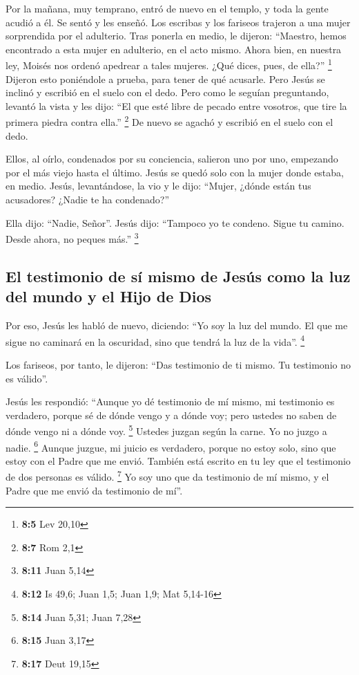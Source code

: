 \begin{paracol}{2}
 Por la mañana, muy temprano, entró de nuevo en el templo,
y toda la gente acudió a él. Se sentó y les enseñó.  Los
escribas y los fariseos trajeron a una mujer sorprendida por el
adulterio. Tras ponerla en medio,  le dijeron: ``Maestro,
hemos encontrado a esta mujer en adulterio, en el acto mismo.
 Ahora bien, en nuestra ley, Moisés nos ordenó apedrear a
tales mujeres. ¿Qué dices, pues, de ella?'' \footnote{\textbf{8:5} Lev
  20,10}  Dijeron esto poniéndole a prueba, para tener de
qué acusarle. Pero Jesús se inclinó y escribió en el suelo con el dedo.
 Pero como le seguían preguntando, levantó la vista y les
dijo: ``El que esté libre de pecado entre vosotros, que tire la primera
piedra contra ella.'' \footnote{\textbf{8:7} Rom 2,1}  De
nuevo se agachó y escribió en el suelo con el dedo.

 Ellos, al oírlo, condenados por su conciencia, salieron
uno por uno, empezando por el más viejo hasta el último. Jesús se quedó
solo con la mujer donde estaba, en medio.  Jesús,
levantándose, la vio y le dijo: ``Mujer, ¿dónde están tus acusadores?
¿Nadie te ha condenado?''

 Ella dijo: ``Nadie, Señor''. Jesús dijo: ``Tampoco yo te
condeno. Sigue tu camino. Desde ahora, no peques más.'' \footnote{\textbf{8:11}
  Juan 5,14}

\hypertarget{el-testimonio-de-suxed-mismo-de-jesuxfas-como-la-luz-del-mundo-y-el-hijo-de-dios}{%
\subsection{El testimonio de sí mismo de Jesús como la luz del mundo y
el Hijo de
Dios}\label{el-testimonio-de-suxed-mismo-de-jesuxfas-como-la-luz-del-mundo-y-el-hijo-de-dios}}

 Por eso, Jesús les habló de nuevo, diciendo: ``Yo soy la
luz del mundo. El que me sigue no caminará en la oscuridad, sino que
tendrá la luz de la vida''. \footnote{\textbf{8:12} Is 49,6; Juan 1,5;
  Juan 1,9; Mat 5,14-16}

 Los fariseos, por tanto, le dijeron: ``Das testimonio de
ti mismo. Tu testimonio no es válido''.

 Jesús les respondió: ``Aunque yo dé testimonio de mí
mismo, mi testimonio es verdadero, porque sé de dónde vengo y a dónde
voy; pero ustedes no saben de dónde vengo ni a dónde voy. \footnote{\textbf{8:14}
  Juan 5,31; Juan 7,28}  Ustedes juzgan según la carne.
Yo no juzgo a nadie. \footnote{\textbf{8:15} Juan 3,17} 
Aunque juzgue, mi juicio es verdadero, porque no estoy solo, sino que
estoy con el Padre que me envió.  También está escrito en
tu ley que el testimonio de dos personas es válido. \footnote{\textbf{8:17}
  Deut 19,15}  Yo soy uno que da testimonio de mí mismo,
y el Padre que me envió da testimonio de mí''.


\end{paracol}
